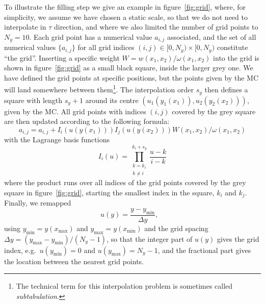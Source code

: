 To illustrate the filling step we give an example in figure~\ref{fig:grid}, where, for simplicity, we assume we have chosen a static scale, so that we do not need to interpolate in $\tau$ direction, and where we also limited the number of grid points to $N_y = 10$.
Each grid point has a numerical value $a_{i,j}$ associated, and the set of all numerical values $\{ a_{i,j} \}$ for all grid indices $(i,j) \in [0,N_y) \times [0,N_y)$ constitute \enquote{the grid}.
Inserting a specific weight $W = w (x_1, x_2) / \omega(x_1, x_2)$ into the grid is shown in figure~\ref{fig:grid} as a small black square, inside the larger grey one.
We have defined the grid points at specific positions, but the points given by the MC will land somewhere between them\footnote{The technical term for this interpolation problem is sometimes called \emph{subtabulation}.}.
The interpolation order $s_y$ then defines a square with length $s_y + 1$ around its centre $(u_1(y_1(x_1)),u_2(y_2(x_2)))$, given by the MC.
All grid points with indices $(i,j)$ covered by the grey square are then updated according to the following formula:
\begin{equation}
a_{i,j} = a_{i,j} + I_i(u(y(x_1))) I_j(u(y(x_2))) W(x_1,x_2) / \omega(x_1,x_2)
\label{eq:interpolation}
\end{equation}
with the Lagrange basis functions
\begin{equation}
I_i (u) = \prod_{\substack{k=k_i \\ k \neq i}}^{k_i + s_y} \frac{u-k}{i-k}
\end{equation}
where the product runs over all indices of the grid points covered by the grey square in figure~\ref{fig:grid}, starting the smallest index in the square, $k_i$ and $k_j$.
Finally, we remapped
\begin{equation}
u(y) = \frac{y-y_\text{min}}{\Delta y} \text{,} \quad
\end{equation}
using $y_\text{min} = y(x_\text{max})$ and $y_\text{max} = y(x_\text{min})$ and the grid spacing $\Delta y = (y_\text{max} - y_\text{min})/(N_y-1)$, so that the integer part of $u(y)$ gives the grid index, e.g.\ $u(y_\text{min}) = 0$ and $u(y_\text{max}) = N_y - 1$, and the fractional part gives the location between the nearest grid points.
